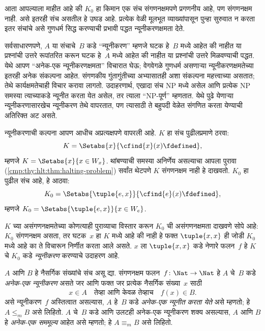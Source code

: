 \begin{explain}
आता आपल्याला माहीत आहे की $K_0$ हा किमान एक संच संगणनक्षमपणे
प्रगणनीय आहे, पण संगणनक्षम नाही. असे इतरही संच असतील हे उघड
आहे. प्रत्येक वेळी मूलभूत व्याख्यांपासून पुन्हा सुरुवात न करता
इतर संचांचे असे गुणधर्म सिद्ध करण्याची प्रभावी पद्धत
न्यूनीकरणक्षमता देते.

सर्वसाधारणपणे, $A$ या संचाचे~$B$ कडे ``न्यूनीकरण'' म्हणजे
घटक हे~$B$ मध्ये आहेत की नाहीत या प्रश्नांची उत्तरे
रूपांतरित करून घटक हे~$A$ मध्ये आहेत की नाहीत या प्रश्नांची उत्तरे
मिळवण्याची पद्धत. येथे आपण ``अनेक-एक न्यूनीकरणक्षमता''
विचारात घेऊ; वेगवेगळे गुणधर्म असणाऱ्या न्यूनीकरणक्षमतेच्या इतरही
अनेक संकल्पना आहेत. संगणकीय गुंतागुंतीच्या अभ्यासातही अशा
संकल्पना महत्त्वाच्या असतात; तेथे कार्यक्षमतेचाही विचार करावा
लागतो. उदाहरणार्थ, एखादा संच NP मध्ये असेल आणि प्रत्येक
NP समस्या त्याच्याकडे न्यूनीत करता येत असेल, तर त्याला
``NP-पूर्ण'' म्हणतात. येथे पुढे येणाऱ्या न्यूनीकरणासारखेच
न्यूनीकरण तेथे वापरतात, पण त्यासाठी ते बहुपदी वेळेत संगणित
करता येण्याची अतिरिक्त अट असते.

न्यूनीकरणाची कल्पना आपण आधीच अप्रत्यक्षपणे वापरली आहे.
$K$ हा संच पुढीलप्रमाणे ठरवा:
\[K = \Setabs{x}{\cfind{x}(x) \fdefined},
\]
म्हणजे $K = \Setabs{x}{x \in W_x}$. थांबण्याची समस्या
अनिर्णेय असल्याचा आपला पुरावा (\ref{cmp:thy:hlt:thm:halting-problem})
सर्वांत थेटपणे $K$ संगणनक्षम नाही हे दाखवतो. $K_0$ हा
पुढील संच आहे, हे आठवा:
\[K_0 = \Setabs{\tuple{e, x}}{\cfind{e}(x) \fdefined },
\]
म्हणजे $K_0 = \Setabs{\tuple{e,x}}{x \in W_e}$.

$K$ च्या असंगणनक्षमतेच्या कोणत्याही पुराव्याचा विस्तार करून
$K_0$ ची असंगणनक्षमता दाखवणे सोपे आहे: $K_0$ संगणनक्षम असता,
तर घटक~$x$ हा $K$ मध्ये आहे की नाही हे फक्त
$\tuple{x, x}$ ही जोडी $K_0$ मध्ये आहे का ते विचारून
निर्णीत करता आले असते. $x$ ला $\tuple{x, x}$ कडे नेणारे
फलन~$f$ हे $K$ चे $K_0$ कडे \emph{न्यूनीकरण} करण्याचे
उदाहरण आहे.
\end{explain}

\begin{defn}
$A$ आणि $B$ हे नैसर्गिक संख्यांचे संच असू द्या.
संगणनक्षम फलन~$f\colon \Nat \to \Nat$ हे $A$ चे~$B$
कडे \emph{अनेक-एक न्यूनीकरण} असते जर आणि फक्त जर
प्रत्येक नैसर्गिक संख्या~$x$ साठी
\[x \in A \quad \text{तेव्हा आणि केवळ तेव्हाच} \quad f(x) \in B.
\]
असे न्यूनीकरण~$f$ अस्तित्वात असल्यास, $A$ हे~$B$ कडे
\emph{अनेक-एक न्यूनीत करता येते} असे म्हणतो; हे
$A \leq_m B$ असे लिहितो. $A$ चे~$B$ कडे आणि उलटही
अनेक-एक न्यूनीकरण शक्य असल्यास, $A$ आणि $B$ हे
\emph{अनेक-एक सममूल्य} आहेत असे म्हणतो; हे
$A \equiv_m B$ असे लिहितो.
\end{defn}

